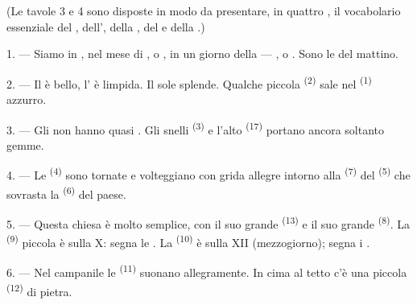 \VUsaut{3.0mm}
\VUsaut{1.6mm}
\VUsaut{3.4mm}

(Le tavole 3 e 4 sono disposte in modo da presentare, in quattro
, il vocabolario essenziale del ,
dell', della , del  e della
.)
\VUsaut{4.0mm}

\VUsaut{3.0mm}

\VUsaut{2.4mm}

\VUsaut{3.0mm}

1. --- Siamo in , nel mese di ,  o
, in un giorno della  --- ,
 o . Sono le  del mattino.

2. --- Il  è bello, l' è limpida. Il sole splende. Qualche
piccola  \textsuperscript{(2)} sale nel 
\textsuperscript{(1)} azzurro.

3. --- Gli  non hanno quasi . Gli snelli
 \textsuperscript{(3)} e l'alto 
\textsuperscript{(17)} portano ancora soltanto gemme.

4. --- Le  \textsuperscript{(4)} sono tornate e volteggiano con grida
allegre intorno alla  \textsuperscript{(7)} del 
\textsuperscript{(5)} che sovrasta la  \textsuperscript{(6)} del paese.

\VUsaut{3.4mm}
\VUsaut{3.0mm}

5. --- Questa chiesa è molto semplice, con il suo grande 
\textsuperscript{(13)} e il suo grande  \textsuperscript{(8)}. La
 \textsuperscript{(9)} piccola è sulla X: segna le . La
 \textsuperscript{(10)} è sulla XII (mezzogiorno); segna i
.

6. --- Nel campanile le  \textsuperscript{(11)} suonano allegramente.
In cima al tetto c'è una piccola  \textsuperscript{(12)} di pietra.


